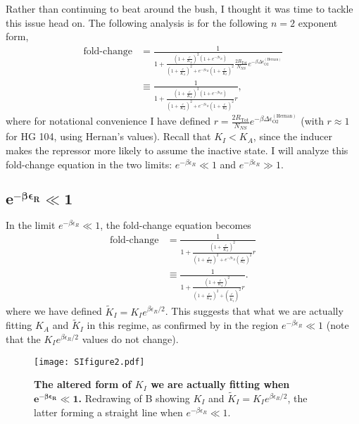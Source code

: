\documentclass[10pt,letterpaper]{article}
\newcommand{\letter}[1]{#1} %
\newcommand \foldchange{\operatorname{fold-change}}
\newcommand{\Rtot}{R_{\text{Tot}}}
\begin{document}
Rather than continuing to beat around the bush, I thought it was time to tackle this issue head on. The following analysis is for the following $n=2$
exponent form,
\begin{align} \label{AppendixSloppinessEq1}
\foldchange &= \frac{1}{1+\frac{\left( 1 + \frac{c}{K_A} \right)^2 \left(1 + e^{-\beta \epsilon_R} \right)}{\left( 1 + \frac{c}{K_A} \right)^2 + e^{-\beta \epsilon_R} \left( 1 + \frac{c}{K_I} \right)^2} \frac{2 \Rtot}{N_{NS}} e^{-\beta \Delta\epsilon_{\text{O2}}^{(\text{Hernan})}}}\nonumber\\
&\equiv \frac{1}{1+\frac{\left( 1 + \frac{c}{K_A} \right)^2 \left(1 + e^{-\beta \epsilon_R} \right)}{\left( 1 + \frac{c}{K_A} \right)^2 + e^{-\beta \epsilon_R} \left( 1 + \frac{c}{K_I} \right)^2} r},
\end{align}
where for notational convenience I have defined $r = \frac{2 \Rtot}{N_{NS}}
e^{-\beta \Delta\epsilon_{\text{O2}}^{(\text{Hernan})}}$ (with $r \approx 1$ for
HG 104, using Hernan's values). Recall that $K_I < K_A$, since the inducer makes
the repressor more likely to assume the inactive state. I will analyze this
fold-change equation in the two limits: $e^{-\beta \epsilon_R} \ll 1$ and
$e^{-\beta \epsilon_R} \gg 1$.

\subsection{$\boldsymbol{e^{-\beta \epsilon_R} \ll 1}$}

In the limit $e^{-\beta \epsilon_R} \ll 1$, the fold-change equation becomes
\begin{align} \label{AppendixSloppinessEq2}
\foldchange &= \frac{1}{1+\frac{\left( 1 + \frac{c}{K_A} \right)^2}{\left( 1 + \frac{c}{K_A} \right)^2 + e^{-\beta \epsilon_R} \left(\frac{c}{K_I} \right)^2} r} \nonumber\\
&\equiv \frac{1}{1+\frac{\left( 1 + \frac{c}{K_A} \right)^2}{\left( 1 + \frac{c}{K_A} \right)^2 + \left(\frac{c}{\widetilde{K}_I} \right)^2} r}.
\end{align}
where we have defined $\widetilde{K}_I = K_I e^{\beta \epsilon_R/2}$. This
suggests that what we are actually fitting $K_A$ and $\widetilde{K}_I$ in this
regime, as confirmed by \fref[SIfig2] in the region $e^{-\beta \epsilon_R} \ll 1$ (note that the $K_I e^{\beta \epsilon_R/2}$ values do not change).
\begin{figure}[h]
	\centering \texttt{[image: SIfigure2.pdf]} \caption{{\bf The altered
			form of $K_I$ we are actually fitting when $\boldsymbol{e^{-\beta \epsilon_R}
				\ll 1}$.} Redrawing of \fref[SIfig1]\letter{B} showing $K_I$ and $\widetilde{K}_I
		= K_I e^{\beta \epsilon_R/2}$, the latter forming a straight line when
		$e^{-\beta \epsilon_R} \ll 1$.} \label{SIfig2}
\end{figure}
\end{document}
